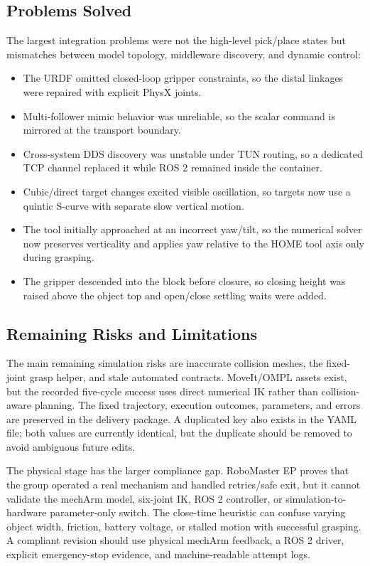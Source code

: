 \documentclass[UTF8,zihao=-4,scheme=chinese,fontset=none]{ctexart}
\begin{document}
\subsection{Problems Solved}
The largest integration problems were not the high-level pick/place states but mismatches between model topology, middleware discovery, and dynamic control:
\begin{itemize}
\item The URDF omitted closed-loop gripper constraints, so the distal linkages were repaired with explicit PhysX joints.
\item Multi-follower mimic behavior was unreliable, so the scalar command is mirrored at the transport boundary.
\item Cross-system DDS discovery was unstable under TUN routing, so a dedicated TCP channel replaced it while ROS 2 remained inside the container.
\item Cubic/direct target changes excited visible oscillation, so targets now use a quintic S-curve with separate slow vertical motion.
\item The tool initially approached at an incorrect yaw/tilt, so the numerical solver now preserves verticality and applies yaw relative to the HOME tool axis only during grasping.
\item The gripper descended into the block before closure, so closing height was raised above the object top and open/close settling waits were added.
\end{itemize}

\subsection{Remaining Risks and Limitations}
The main remaining simulation risks are inaccurate collision meshes, the fixed-joint grasp helper, and stale automated contracts. MoveIt/OMPL assets exist, but the recorded five-cycle success uses direct numerical IK rather than collision-aware planning. The fixed trajectory, execution outcomes, parameters, and errors are preserved in the delivery package. A duplicated  key also exists in the YAML file; both values are currently identical, but the duplicate should be removed to avoid ambiguous future edits.

The physical stage has the larger compliance gap. RoboMaster EP proves that the group operated a real mechanism and handled retries/safe exit, but it cannot validate the mechArm model, six-joint IK, ROS 2 controller, or simulation-to-hardware parameter-only switch. The close-time heuristic can confuse varying object width, friction, battery voltage, or stalled motion with successful grasping. A compliant revision should use physical mechArm feedback, a ROS 2 driver, explicit emergency-stop evidence, and machine-readable attempt logs.
\end{document}
